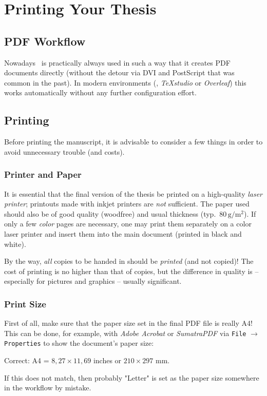 \chapter{Printing Your Thesis}
\label{cha:Printing}


\section{PDF Workflow}
\label{sec:pdf-workflow}

Nowadays \latex\ is practically always used in such a way that it creates PDF
documents directly (without the detour via DVI and PostScript that was common
in the past). In modern environments (\eg, \emph{TeXstudio} or \emph{Overleaf})
this works automatically without any further configuration effort.


\section{Printing}

Before printing the manuscript, it is advisable to consider a few things in
order to avoid unnecessary trouble (and costs).


\subsection{Printer and Paper}

It is essential that the final version of the thesis be printed on a high-quality
\emph{laser printer}; printouts made with inkjet printers are \emph{not} sufficient.
The paper used should also be of good quality (woodfree) and usual thickness 
(typ.\ $80\,\mathrm{g} / \mathrm{m}^2$). If only a few \emph{color} pages are
necessary, one may print them separately on a color laser printer and insert
them into the main document (printed in black and white).

By the way, \emph{all} copies to be handed in should be \emph{printed} (and not 
copied)! The cost of printing is no higher than that of copies, but the difference
in quality is -- especially for pictures and graphics -- usually significant.


\subsection{Print Size}

First of all, make sure that the paper size set in the final PDF file is really
\textrm{A4}! This can be done, for example, with \emph{Adobe Acrobat} or 
\emph{SumatraPDF} via \texttt{File} $\rightarrow$ \texttt{Properties} 
to show the document's paper size:
%
\begin{center}
	\textrm{Correct:} A4 = $8{,}27 \times 11{,}69$ inches or $210 \times 297$ mm.
\end{center}
%
If this does not match, then probably "Letter" is set as the paper size somewhere
in the workflow by mistake.

